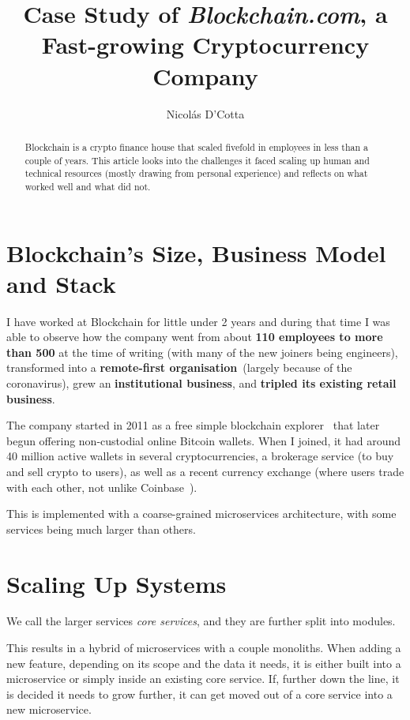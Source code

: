 \documentclass[conference]{IEEEtran}
\title{Case Study of \emph{Blockchain.com}, a Fast-growing Cryptocurrency Company}
\begin{document}
    \author{Nicolás D'Cotta}

    \maketitle

    \begin{abstract}
        Blockchain is a crypto finance house that scaled fivefold in
        employees in less than a couple of years.
        This article looks into the challenges it faced scaling up human and
        technical resources (mostly drawing from personal experience) and reflects
        on what worked well and what did not.
    \end{abstract}


    \section{Blockchain's Size, Business Model and Stack}\label{sec:business}

    I have worked at Blockchain for little under 2 years and during that time I was able to observe
    how the company went from about \textbf{110 employees to more than 500} at the time of writing (with many
    of the new joiners being engineers), transformed into a \textbf{remote-first organisation}~(largely because
    of the coronavirus), grew an \textbf{institutional business}, and \textbf{tripled its existing retail business}.

    The company started in 2011 as a free simple blockchain explorer~\cite{bcAbout} that later
    begun offering non-custodial online Bitcoin wallets.
    When I joined, it had around 40 million active wallets in several cryptocurrencies,
    a brokerage service (to buy and sell crypto to users), as well as a recent currency
    exchange (where users trade with each other, not unlike Coinbase~\cite{coinbasePro}).

    This is implemented with a coarse-grained microservices architecture, with some services
    being much larger than others.


    \section{Scaling Up Systems}
    We call the larger services \emph{core services}, and they are further split into modules.

    This results in a hybrid of microservices with a
    couple monoliths.
    When adding a new feature, depending on its scope and the data it needs, it
    is either built into a microservice or simply inside an existing core service.
    If, further down the line, it is decided it needs to grow further, it can get moved out of a core service into a
    new microservice.
\end{document}
